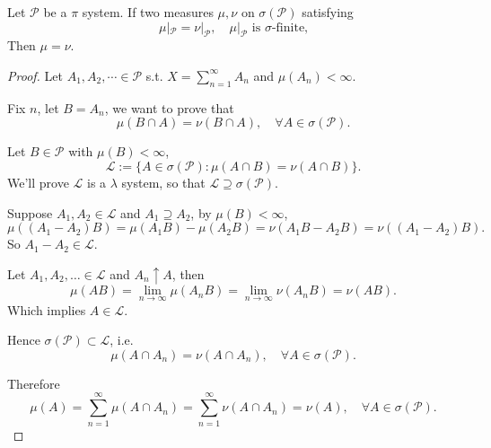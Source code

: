 \begin{proposition}
	Let $ \mathscr{P}$ be a $\pi$ system. If two measures $\mu,\nu$
	on $\sigma(\mathscr{P})$ satisfying
	\[
	\mu|_{\mathscr{P}} = \nu|_{\mathscr{P}}, \quad \mu|_{\mathscr{P}}
	\text{ is $\sigma$-finite,}
	\]
	Then  $\mu = \nu$.
\end{proposition}
\begin{proof}[Proof]
    Let $A_1,A_2,\cdots\in \mathscr{P}$ s.t. $X = \sum_{n=1}^\infty A_n$ and
	$\mu(A_n)<\infty$.

	Fix $n$, let $B = A_n$, we want to prove that
	\[
		\mu(B\cap A)=\nu(B\cap A),\quad \forall A\in \sigma(\mathscr{P}).
	\]

	Let $B\in \mathscr{P}$ with $\mu(B)<\infty$,
	\[
	\mathscr{L} := \{A\in \sigma(\mathscr{P}): \mu(A\cap B) = \nu(A\cap B)\}.
	\]
	We'll prove $\mathscr{L}$ is a $\lambda$ system,
	so that $\mathscr{L}\supseteq \sigma(\mathscr{P})$.

	Suppose $A_1,A_2\in \mathscr{L}$ and $A_1\supseteq A_2$, by $\mu(B)<\infty$,
	\[
	\mu((A_1-A_2)B) = \mu(A_1B) - \mu(A_2B)
	= \nu(A_1B-A_2B) = \nu((A_1-A_2)B).
	\]
	So $A_1-A_2\in \mathscr{L}$.

	Let $A_1,A_2,\dots\in \mathscr{L}$ and $A_n\uparrow A$, then
	 \[
	\mu(AB) = \lim_{n\to \infty}\mu(A_nB) = \lim_{n\to \infty}\nu(A_n B) = \nu(AB).
	\]
	Which implies $A\in \mathscr{L}$.

	Hence $\sigma(\mathscr{P}) \subset \mathscr{L}$, i.e.
	\[
	\mu(A\cap A_n) = \nu(A\cap A_n), \quad\forall A\in \sigma(\mathscr{P}).
	\]
	
	Therefore
	\[
	\mu(A) = \sum_{n=1}^{\infty}\mu(A\cap A_n) = \sum_{n=1}^{\infty} \nu(A\cap A_n)
	= \nu(A), \quad \forall A\in \sigma(\mathscr{P}).
	\]
\end{proof}
